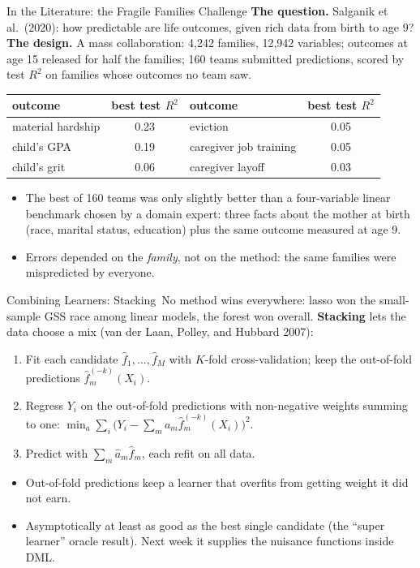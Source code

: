 \documentclass[aspectratio=169,11pt,xcolor=dvipsnames]{beamer}
\newcommand{\srcp}[1]{{\scriptsize\color{gray}(#1)}}
\newcommand{\adv}{\,\raisebox{0.6pt}{\textcolor{accent}{$\bigstar$}}}
\begin{document}
\begin{frame}{In the Literature: the Fragile Families Challenge}
\textbf{The question.} Salganik et al.\ (2020): how predictable are life outcomes, given rich data from
birth to age 9?
\textbf{The design.} A mass collaboration: 4,242 families, 12,942 variables;
outcomes at age 15 released for half the families; 160 teams submitted
predictions, scored by test $R^2$ on families whose outcomes no team saw.
\begin{center}\small
\renewcommand{\arraystretch}{1.0}
\begin{tabular}{@{}lc|lc@{}}
\toprule
outcome & best test $R^2$ & outcome & best test $R^2$ \\
\midrule
material hardship & 0.23 & eviction & 0.05 \\
child's GPA & 0.19 & caregiver job training & 0.05 \\
child's grit & 0.06 & caregiver layoff & 0.03 \\
\bottomrule
\end{tabular}
\end{center}
\begin{itemize}\itemsep1pt
  \item The best of 160 teams was only slightly better than a four-variable
        linear benchmark chosen by a domain expert: three facts about the mother at
        birth (race, marital status, education) plus the same outcome measured at age 9.
  \item Errors depended on the \emph{family}, not on the method: the same families
        were mispredicted by everyone.
\end{itemize}
\end{frame}

\begin{frame}{Combining Learners: Stacking\adv}
No method wins everywhere: lasso won the small-sample GSS race among linear
models, the forest won overall. \textbf{Stacking} lets the data choose a mix
\srcp{van der Laan, Polley, and Hubbard 2007}:
\begin{enumerate}\itemsep2pt
  \item Fit each candidate $\hat f_1,\dots,\hat f_M$ with $K$-fold
        cross-validation; keep the out-of-fold predictions $\hat f_m^{(-k)}(X_i)$.
  \item Regress $Y_i$ on the out-of-fold predictions with non-negative weights
        summing to one: $\min_{a}\sum_i\big(Y_i - \sum_m a_m\hat f_m^{(-k)}(X_i)\big)^2$.
  \item Predict with $\sum_m \hat a_m\hat f_m$, each refit on all data.
\end{enumerate}
\vskip3pt
\begin{itemize}\itemsep2pt
  \item Out-of-fold predictions keep a learner that overfits from getting weight
        it did not earn.
  \item Asymptotically at least as good as the best single candidate
        (the ``super learner'' oracle result). Next week it supplies the nuisance
        functions inside DML.
\end{itemize}
\end{frame}
\end{document}
